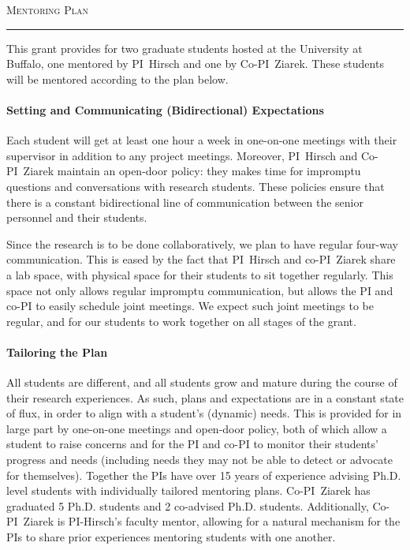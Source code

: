 

\usepackage{paralist}



\begin{center}
{\LARGE
\textsc{Mentoring Plan}
}
\end{center}
\hrule

\vspace{3mm}

This grant provides for two graduate students hosted at the University at Buffalo, one mentored by PI~Hirsch and one by Co-PI~Ziarek.
These students will be mentored according to the plan below.

\paragraph{Setting and Communicating (Bidirectional) Expectations}
Each student will get at least one hour a week in one-on-one meetings with their supervisor in addition to any project meetings.
Moreover, PI~Hirsch and Co-PI~Ziarek maintain an open-door policy: they makes time for impromptu questions and conversations with research students.
These policies ensure that there is a constant bidirectional line of communication between the senior personnel and their students.

Since the research is to be done collaboratively, we plan to have regular four-way communication.
This is eased by the fact that PI~Hirsch and co-PI~Ziarek share a lab space, with physical space for their students to sit together regularly.
This space not only allows regular impromptu communication, but allows the PI and co-PI to easily schedule joint meetings.
We expect such joint meetings to be regular, and for our students to work together on all stages of the grant.

\paragraph{Tailoring the Plan}

All students are different, and all students grow and mature during the course of their research experiences.
As such, plans and expectations are in a constant state of flux, in order to align with a student's (dynamic) needs.
This is provided for in large part by one-on-one meetings and open-door policy, both of which allow a student to raise concerns and for the PI and co-PI to monitor their students' progress and needs (including needs they may not be able to detect or advocate for themselves).   Together the PIs have over 15 years of experience advising Ph.D. level students with individually tailored mentoring plans. Co-PI~Ziarek has graduated 5 Ph.D. students and 2 co-advised Ph.D. students.   Additionally, Co-PI~Ziarek is PI-Hirsch's faculty mentor, allowing for a natural mechanism for the PIs to share prior experiences mentoring students with one another.



